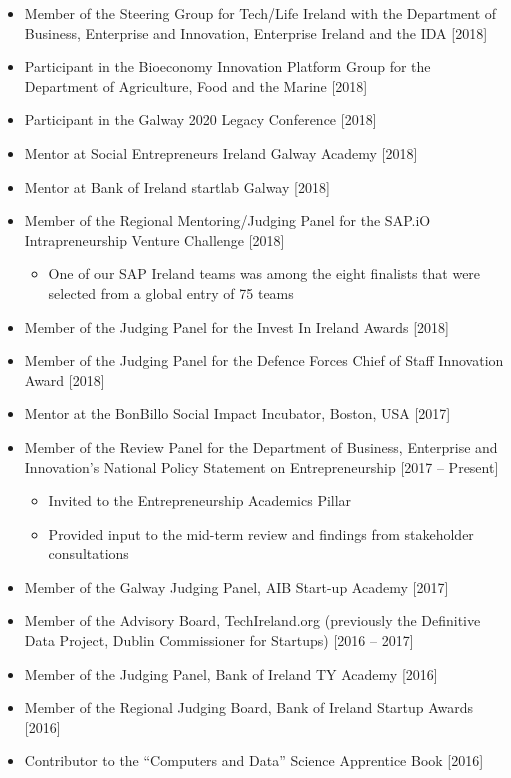 \documentclass[10pt,a4paper]{res} %
\begin{document}
\begin{resume}
\begin{itemize} \itemsep -2pt
\item Member of the Steering Group for Tech/Life Ireland with the Department of Business, Enterprise and Innovation, Enterprise Ireland and the IDA [2018]
\item Participant in the Bioeconomy Innovation Platform Group for the Department of Agriculture, Food and the Marine [2018]
\item Participant in the Galway 2020 Legacy Conference [2018]
\item Mentor at Social Entrepreneurs Ireland Galway Academy [2018]
\item Mentor at Bank of Ireland startlab Galway [2018]
\item Member of the Regional Mentoring/Judging Panel for the SAP.iO Intrapreneurship Venture Challenge [2018]
\begin{itemize} \itemsep -2pt
\item One of our SAP Ireland teams was among the eight finalists that were selected from a global entry of 75 teams
\end{itemize}
\item Member of the Judging Panel for the Invest In Ireland Awards [2018]
\item Member of the Judging Panel for the Defence Forces Chief of Staff Innovation Award [2018]
\item Mentor at the BonBillo Social Impact Incubator, Boston, USA [2017]
\item Member of the Review Panel for the Department of Business, Enterprise and Innovation's National Policy Statement on Entrepreneurship [2017 -- Present]
\begin{itemize} \itemsep -2pt
\item Invited to the Entrepreneurship Academics Pillar
\item Provided input to the mid-term review and findings from stakeholder consultations
\end{itemize}
\item Member of the Galway Judging Panel, AIB Start-up Academy [2017]
\item Member of the Advisory Board, TechIreland.org (previously the Definitive Data Project, Dublin Commissioner for Startups) [2016 -- 2017]
\item Member of the Judging Panel, Bank of Ireland TY Academy [2016]
\item Member of the Regional Judging Board, Bank of Ireland Startup Awards [2016]
\item Contributor to the ``Computers and Data'' Science Apprentice Book [2016]

\end{itemize}
\end{resume}
\end{document}
